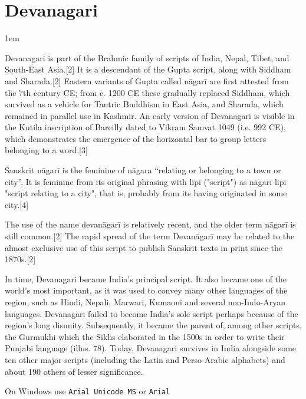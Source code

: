 \section{Devanagari}
\label{s:devanagari}
\parindent1em

Devanagari is part of the Brahmic family of scripts of India, Nepal, Tibet, and South-East Asia.[2] It is a descendant of the Gupta script, along with Siddham and Sharada.[2] Eastern variants of Gupta called nāgarī are first attested from the 7th century CE; from c. 1200 CE these gradually replaced Siddham, which survived as a vehicle for Tantric Buddhism in East Asia, and Sharada, which remained in parallel use in Kashmir. An early version of Devanagari is visible in the Kutila inscription of Bareilly dated to Vikram Samvat 1049 (i.e. 992 CE), which demonstrates the emergence of the horizontal bar to group letters belonging to a word.[3]

Sanskrit nāgarī is the feminine of nāgara \enquote{relating or belonging to a town or city}. It is feminine from its original phrasing with lipi ("script") as nāgarī lipi "script relating to a city", that is, probably from its having originated in some city.[4]

The use of the name devanāgarī is relatively recent, and the older term nāgarī is still common.[2] The rapid spread of the term Devanāgarī may be related to the almost exclusive use of this script to publish Sanskrit texts in print since the 1870s.[2]

In time, Devanagari became India’s principal script. It also
became one of the world’s most important, as it was used to
convey many other languages of the region, such as Hindi, Nepali, Marwari, 
Kumaoni and several non-Indo-Aryan
languages. Devanagari failed to become India’s sole script perhaps
because of the region’s long disunity. Subsequently, it
became the parent of, among other scripts, the Gurmukhi
which the Sikhs elaborated in the 1500s in order to write their
Punjabi language (illus. 78). Today, Devanagari survives in India
alongside some ten other major scripts (including the Latin and
Perso-Arabic alphabets) and about 190 others of lesser significance.\cite{writing}

On Windows use \texttt{Arial Unicode MS} or \texttt{Arial}
\medskip

\newfontfamily{}
\let\devanagari\devanagarilohit

